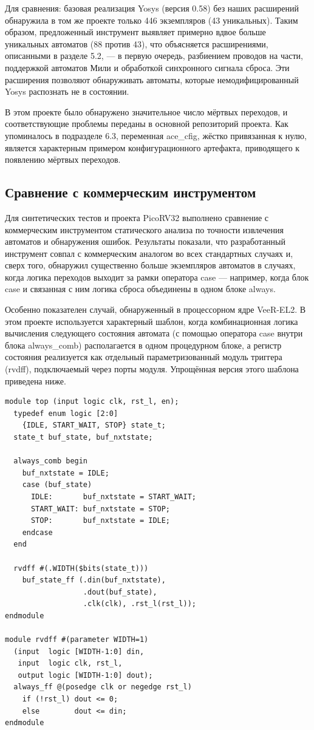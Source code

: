 Для сравнения: базовая реализация Yosys (версия 0.58) без наших расширений обнаружила в том же проекте
только 446 экземпляров (43 уникальных). Таким образом, предложенный инструмент выявляет примерно вдвое
больше уникальных автоматов (88 против 43), что объясняется расширениями, описанными в разделе 5.2, ---
в первую очередь, разбиением проводов на части, поддержкой автоматов Мили и обработкой синхронного
сигнала сброса. Эти расширения позволяют обнаруживать автоматы, которые немодифицированный Yosys
распознать не в состоянии.

В этом проекте было обнаружено значительное число мёртвых переходов, и соответствующие проблемы
переданы в основной репозиторий проекта. Как упоминалось в подразделе 6.3, переменная ace\_cfig,
жёстко привязанная к нулю, является характерным примером конфигурационного артефакта, приводящего
к появлению мёртвых переходов.

\subsection{Сравнение с коммерческим инструментом}

Для синтетических тестов и проекта PicoRV32 выполнено сравнение с коммерческим инструментом статического
анализа по точности извлечения автоматов и обнаружения ошибок. Результаты показали, что разработанный
инструмент совпал с коммерческим аналогом во всех стандартных случаях и, сверх того, обнаружил существенно
больше экземпляров автоматов в случаях, когда логика переходов выходит за рамки оператора case — например,
когда блок case и связанная с ним логика сброса объединены в одном блоке always.

Особенно показателен случай, обнаруженный в процессорном ядре VeeR-EL2. В этом проекте используется
характерный шаблон, когда комбинационная логика вычисления следующего состояния автомата (с помощью
оператора case внутри блока always\_comb) располагается в одном процедурном блоке, а регистр состояния
реализуется как отдельный параметризованный модуль триггера (rvdff), подключаемый через порты модуля.
Упрощённая версия этого шаблона приведена ниже.

\begin{lstlisting}
module top (input logic clk, rst_l, en);
  typedef enum logic [2:0]
    {IDLE, START_WAIT, STOP} state_t;
  state_t buf_state, buf_nxtstate;
 
  always_comb begin
    buf_nxtstate = IDLE;
    case (buf_state)
      IDLE:       buf_nxtstate = START_WAIT;
      START_WAIT: buf_nxtstate = STOP;
      STOP:       buf_nxtstate = IDLE;
    endcase
  end
 
  rvdff #(.WIDTH($bits(state_t)))
    buf_state_ff (.din(buf_nxtstate),
                  .dout(buf_state),
                  .clk(clk), .rst_l(rst_l));
endmodule
 
module rvdff #(parameter WIDTH=1)
  (input  logic [WIDTH-1:0] din,
   input  logic clk, rst_l,
   output logic [WIDTH-1:0] dout);
  always_ff @(posedge clk or negedge rst_l)
    if (!rst_l) dout <= 0;
    else        dout <= din;
endmodule
\end{lstlisting}

